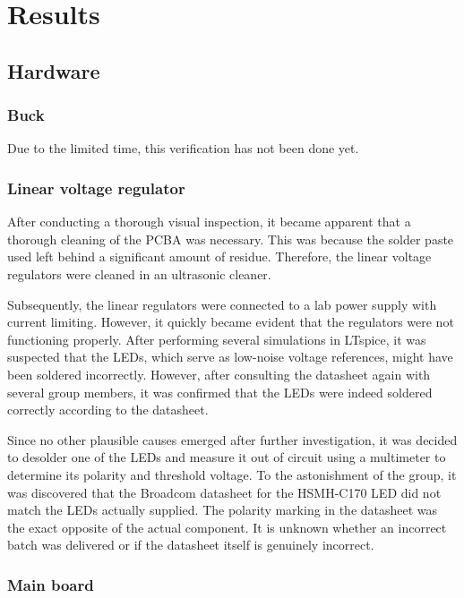 \section{Results}

\subsection{Hardware}

\subsubsection{Buck}
Due to the limited time, this verification has not been done yet.

\subsubsection{Linear voltage regulator}
After conducting a thorough visual inspection, it became apparent that a thorough cleaning of the PCBA was necessary. This was because the solder paste used left behind a significant amount of residue. Therefore, the linear voltage regulators were cleaned in an ultrasonic cleaner.

Subsequently, the linear regulators were connected to a lab power supply with current limiting. However, it quickly became evident that the regulators were not functioning properly. After performing several simulations in LTspice, it was suspected that the LEDs, which serve as low-noise voltage references, might have been soldered incorrectly. However, after consulting the datasheet again with several group members, it was confirmed that the LEDs were indeed soldered correctly according to the datasheet.

Since no other plausible causes emerged after further investigation, it was decided to desolder one of the LEDs and measure it out of circuit using a multimeter to determine its polarity and threshold voltage. To the astonishment of the group, it was discovered that the Broadcom datasheet for the HSMH-C170 LED did not match the LEDs actually supplied. The polarity marking in the datasheet was the exact opposite of the actual component. It is unknown whether an incorrect batch was delivered or if the datasheet itself is genuinely incorrect.

\subsubsection{Main board}
